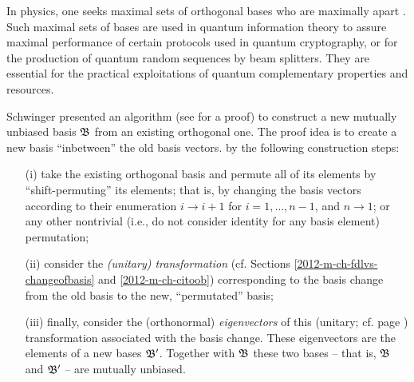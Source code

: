 {\color{Purple}
In physics, one seeks maximal sets of orthogonal bases who
are maximally apart \cite{WooFie,durt} .
Such maximal sets of bases are used in quantum information theory
to assure maximal performance of certain protocols
used in quantum cryptography, or for the production of
quantum random sequences by beam splitters.
They are essential for the practical exploitations of quantum complementary properties
and resources.
}



Schwinger presented an algorithm (see \cite{Schwinger.60} for a proof)
to construct a new mutually unbiased basis ${\frak B}$   from an existing orthogonal one.
The proof idea
is to create a new basis ``inbetween'' the old basis vectors.
by the following construction steps:
\begin{itemize}
\item[(i)]
take the existing orthogonal basis and permute all of its elements by ``shift-permuting'' its elements; that is, by
changing
the basis vectors according to their enumeration $i \rightarrow i+1$ for $i=1,\ldots , n-1$, and $n \rightarrow 1$;
or any other nontrivial (i.e., do not consider identity for any basis element) permutation;
\item[(ii)]
consider the {\em (unitary) transformation} (cf. Sections \ref{2012-m-ch-fdlvs-changeofbasis} and \ref{2012-m-ch-citoob})
corresponding to the basis change from the old basis to the new, ``permutated'' basis;
\item[(iii)]
finally, consider the (orthonormal) {\em eigenvectors} 
of this (unitary; cf. page
\pageref{2014-m-ch-fdvs-unitary}) transformation associated with the basis change.
These eigenvectors are the elements of a new bases  ${\frak B}'$.
Together with ${\frak B}$ these two bases
-- that is, ${\frak B}$ and ${\frak B}'$ --  are mutually unbiased.
\end{itemize}

